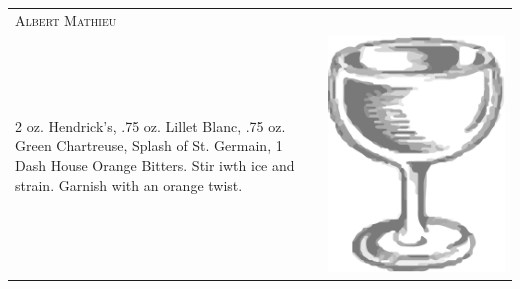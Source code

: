 \documentclass{article}
\begin{document}
\begin{tabular}{p{2in} p{0.5in}}
\multicolumn{2}{p{3in}}{\centering\Huge\textsc{Albert Mathieu}}\\ 
  \vspace{-0.1in} 2 oz. Hendrick's, .75 oz. Lillet Blanc, .75 oz. Green Chartreuse, Splash of St. Germain, 1 Dash House Orange Bitters. Stir iwth ice and strain. Garnish with an orange twist. &
  \vspace{-0.1in} \includegraphics{coupe.png}
\end{tabular}
\end{document}
